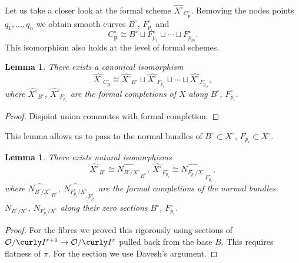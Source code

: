 \documentclass[12pt]{amsart}
\newtheorem{lemma}[theorem]{Lemma}
\theoremstyle{definition}
\theoremstyle{property}
\newcommand\I{\curly I}
\renewcommand\O{\mathcal O}
\newcommand\p{\mathbf{p}}
\renewcommand\_{^{}_}
\begin{document}
Let us take a closer look at the formal scheme $\widehat{X^\circ}_{C_{\p}^\circ}$. 
Removing the nodes points $q_1, \ldots, q_n$ we obtain smooth curves $B^{\circ}$, $F_{p_i}^{\circ}$ and
$$
C_{\p}^{\circ} \cong B^{\circ} \sqcup F_{p_1}^{\circ} \sqcup \cdots \sqcup F_{p_m}^{\circ}.
$$
This isomorphism also holds at the level of formal schemes.
\begin{lemma} \label{lem4}
There exists a canonical isomorphism
$$
\widehat{X^\circ}_{C_{\p}^\circ} \cong \widehat{X^{\circ}}_{B^{\circ}} \sqcup \widehat{X^\circ}_{F_{p_1}^{\circ}} \sqcup \cdots \sqcup \widehat{X^\circ}_{F_{p_m}^{\circ}},
$$
where $\widehat{X^{\circ}}_{B^{\circ}}$, $\widehat{X^\circ}_{F_{p_i}^{\circ}}$ are the formal completions of $X$ along $B^\circ$, $F_{p_i}^{\circ}$. 
\end{lemma}
\begin{proof}
Disjoint union commutes with formal completion.
\end{proof}

This lemma allows us to pass to the normal bundles of $B^\circ \subset X^\circ$, $F_{p_i}^{\circ} \subset X^\circ$.
\begin{lemma} \label{lem5}
There exists natural isomorphisms
$$
\widehat{X^{\circ}}_{B^{\circ}} \cong \widehat{N_{B^{\circ} / X^\circ}}_{B^\circ}, \ \widehat{X^{\circ}}_{F_{p_i}^{\circ}} \cong \widehat{N_{F_{p_i}^{\circ} / X^\circ}}_{F_{p_i}^\circ}, 
$$
where $\widehat{N_{B^{\circ} / X^\circ}}_{B^\circ}$, $\widehat{N_{F_{p_i}^{\circ} / X^\circ}}_{F_{p_i}^{\circ}}$ are the formal completions of the normal bundles $N_{B^\circ / X^\circ}$, $N_{F_{p_i}^{\circ} / X^\circ}$ along their zero sections $B^\circ$, $F_{p_i}^{\circ}$.
\end{lemma}
\begin{proof}
For the fibres we proved this rigorously using sections of $\O / \I^{r+1} \rightarrow \O / \I^{r}$ pulled back from the base $B$. This requires flatness of $\pi$. For the section we use Davesh's argument.
\end{proof}
\end{document}
